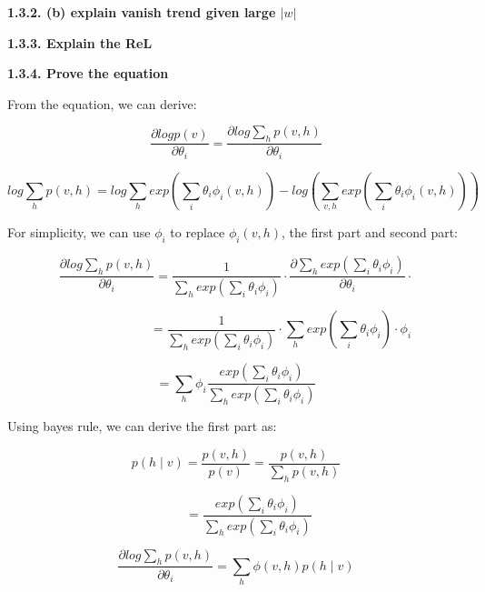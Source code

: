 \documentclass{article} %
\newcommand{\abs}[1]{\left\lvert #1 \right\rvert}
\begin{document}
\textbf{1.3.2. (b) explain vanish trend given large $\abs{w}$}


\textbf{1.3.3. Explain the ReL}


\textbf{1.3.4. Prove the equation}

From the equation, we can derive:

\begin{equation}
\frac{\partial log p(v)}{\partial \theta_i} =
\frac{\partial log \sum_h p(v, h)}{\partial \theta_i}
\end{equation}

\begin{equation}
log \sum_h p(v,h) = log \sum_h exp(\sum_i \theta_i \phi_i (v,h))
- log (\sum_{v,h} exp (\sum_i \theta_i \phi_i (v,h)))
\end{equation}

For simplicity, we can use $\phi_i$ to replace $\phi_i (v,h)$,
the first part and second part:

\begin{equation}
\frac{\partial log \sum_h p(v,h)}{\partial \theta_i} =
\frac{1}{\sum_h exp(\sum_i \theta_i \phi_i)} \cdot
\frac{\partial \sum_h exp(\sum_i \theta_i \phi_i)}{\partial \theta_i} \cdot
\end{equation}

\begin{equation}
\qquad \qquad \qquad \quad =
\frac{1}{\sum_h exp(\sum_i \theta_i \phi_i)} \cdot
\sum_h exp(\sum_i \theta_i \phi_i) \cdot \phi_i
\end{equation}

\begin{equation}
= \sum_h \phi_i \frac{exp(\sum_i \theta_i \phi_i)}
{\sum_h exp(\sum_i \theta_i \phi_i)}
\end{equation}

Using bayes rule, we can derive the first part as:

\begin{equation}
p (h \mid v) = \frac{p(v,h)}{p(v)} = \frac{p(v,h)}{\sum_h p(v,h)}
\end{equation}

\begin{equation}
\qquad = 
\frac{exp(\sum_i \theta_i \phi_i)}{\sum_h exp(\sum_i \theta_i \phi_i)}
\end{equation}

\begin{equation}
\frac{\partial log \sum_h p(v,h)}{\partial \theta_i} =
\sum_h \phi(v,h) p (h \mid v)
\end{equation}
\end{document}

